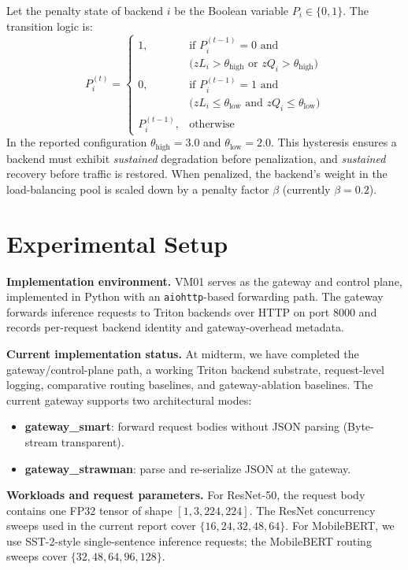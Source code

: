 \documentclass[12pt,conference]{IEEEtran}
\begin{document}
Let the penalty state of backend $i$ be the Boolean variable $P_i \in \{0,1\}$. The transition logic is:
\begin{equation}
P_i^{(t)} =
\begin{cases}
1, & \text{if } P_i^{(t-1)} = 0 \text{ and } \\
   & \bigl(zL_i > \theta_{\text{high}} \text{ or } zQ_i > \theta_{\text{high}}\bigr) \\
0, & \text{if } P_i^{(t-1)} = 1 \text{ and } \\
   & \bigl(zL_i \leq \theta_{\text{low}} \text{ and } zQ_i \leq \theta_{\text{low}}\bigr) \\
P_i^{(t-1)}, & \text{otherwise}
\end{cases}
\label{eq:transition_logic}
\end{equation}
In the reported configuration $\theta_{\text{high}} = 3.0$ and $\theta_{\text{low}} = 2.0$. This hysteresis ensures a backend must exhibit \emph{sustained} degradation before penalization, and \emph{sustained} recovery before traffic is restored. When penalized, the backend's weight in the load-balancing pool is scaled down by a penalty factor $\beta$ (currently $\beta = 0.2$).

\section{Experimental Setup}

\noindent\textbf{Implementation environment.}
VM01 serves as the gateway and control plane, implemented in Python with an \texttt{aiohttp}-based forwarding path. The gateway forwards inference requests to Triton backends over HTTP on port 8000 and records per-request backend identity and gateway-overhead metadata.

\noindent\textbf{Current implementation status.}
At midterm, we have completed the gateway/control-plane path, a working Triton backend substrate, request-level logging, comparative routing baselines, and gateway-ablation baselines. The current gateway supports two architectural modes:
\begin{itemize}
    \item \textbf{gateway\_smart}: forward request bodies without JSON parsing (Byte-stream transparent).
    \item \textbf{gateway\_strawman}: parse and re-serialize JSON at the gateway.
\end{itemize}

\noindent\textbf{Workloads and request parameters.}
For ResNet-50, the request body contains one FP32 tensor of shape $[1,3,224,224]$. The ResNet concurrency sweeps used in the current report cover $\{16,24,32,48,64\}$. For MobileBERT, we use SST-2-style single-sentence inference requests; the MobileBERT routing sweeps cover $\{32,48,64,96,128\}$. 
\end{document}
